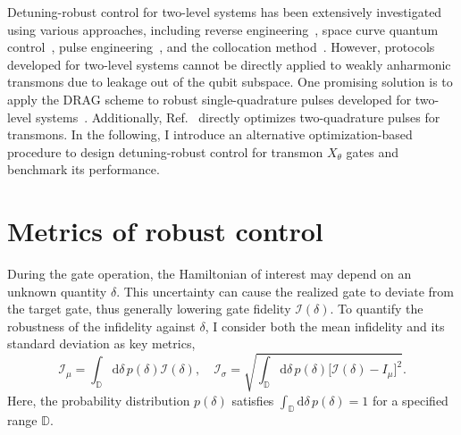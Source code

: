 Detuning-robust control for two-level systems has been extensively investigated using various approaches, including reverse engineering~\cite{PhysRevLett.111.050404inverseengi,PhysRevLett.125.250403inverseengi}, space curve quantum control~\cite{barnes2022dynamicallyspacecurve}, pulse engineering~\cite{barnes2022dynamicallyspacecurve,wang2012compositepulse,PhysRevA.83.053420pulse,PhysRevA.86.022315pulse,tycko1983broadbandpulse,PhysRevA.107.023103pulse,ball2021softwarepulseengi,wimperis1994broadbandpulse,pasini2009optimizedinitialpulse}, and the collocation method~\cite{propson2022robustcollocation,Trowbridge2023}. However, protocols developed for two-level systems cannot be directly applied to weakly anharmonic transmons due to leakage out of the qubit subspace. One promising solution is to apply the DRAG scheme to robust single-quadrature pulses developed for two-level systems~\cite{hai2023universalcompare}. 
Additionally, Ref.~\cite{qctrl} directly optimizes two-quadrature pulses for transmons.
In the following, I introduce an alternative optimization-based procedure to design detuning-robust control for transmon $X_{\theta}$ gates and benchmark its performance.

\section{Metrics of robust control}
\label{sec:metrics}

During the gate operation, the Hamiltonian of interest may depend on an unknown quantity $\delta$. This uncertainty can cause the realized gate to deviate from the target gate, thus generally lowering gate fidelity $\mathcal{I}(\delta)$. To quantify the robustness of the infidelity against $\delta$, I consider both the mean infidelity and its standard deviation as key metrics,
\begin{equation}
\label{eq:robust_metrics}
\mathcal{I}_\mu = \int_\mathbb{D} \mathrm{d}\delta\, p(\delta)\mathcal{I}(\delta), \quad
\mathcal{I}_\sigma =\sqrt{\int_\mathbb{D} \mathrm{d}\delta \, p(\delta)\big[\mathcal{I}(\delta)-I_\mu\big]^2 }.
\end{equation}
Here, the probability distribution $p(\delta)$ satisfies $\int_\mathbb{D}\mathrm{d}\delta \, p(\delta)=1$ for a specified range $\mathbb{D}$. 


